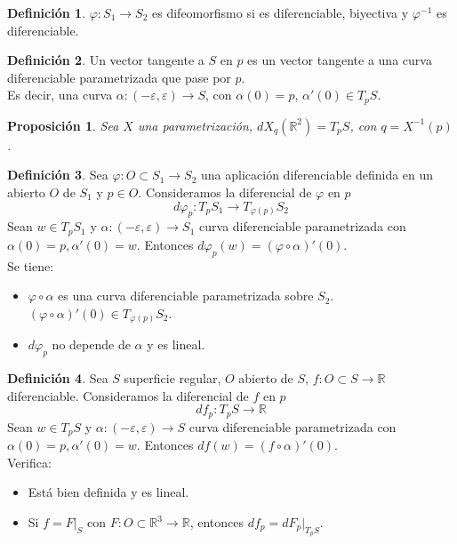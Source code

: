 \documentclass{report}
\newtheorem{proposition}[theorem]{Proposición}
\theoremstyle{remark}
\theoremstyle{remark}
\theoremstyle{definition}
\newtheorem{definition}{Definición}[chapter]
\theoremstyle{definition}
\theoremstyle{definition}
\begin{document}
\begin{definition}
    $\varphi : S_1 \to S_2$ es difeomorfismo si es diferenciable, biyectiva y $\varphi^{-1}$ es diferenciable.
\end{definition}

\begin{definition}
    Un vector tangente a $S$ en $p$ es un vector tangente a una curva diferenciable parametrizada que pase por $p$.\\
    Es decir, una curva $\alpha : (-\varepsilon, \varepsilon) \to S$, con $\alpha(0) = p$, $\alpha'(0) \in T_pS$.
\end{definition}

\begin{proposition}
    Sea $X$ una parametrización, $dX_q(\mathbb{R}^2) = T_pS$, con $q = X^{-1}(p)$.
\end{proposition}

\begin{definition}
    Sea $\varphi : O \subset S_1 \to S_2$ una aplicación diferenciable definida en un abierto $O$ de $S_1$ y $p \in O$.
    Consideramos la diferencial de $\varphi$ en $p$
    $$d\varphi_p : T_pS_1 \to T_{\varphi(p)}S_2$$
    Sean $w \in T_pS_1$ y $\alpha : (-\varepsilon, \varepsilon) \to S_1$ curva diferenciable parametrizada con $\alpha(0) = p, \alpha'(0) = w$.
    Entonces $d\varphi_p(w) = (\varphi \circ \alpha)'(0)$.\\
    Se tiene:
    \begin{itemize}
        \item $\varphi \circ \alpha$ es una curva diferenciable parametrizada sobre $S_2$. $(\varphi \circ \alpha)'(0) \in T_{\varphi(p)}S_2$.
        \item $d\varphi_p$ no depende de $\alpha$ y es lineal.
    \end{itemize}
\end{definition}

\begin{definition}
    Sea $S$ superficie regular, $O$ abierto de $S$, $f : O \subset S \to \mathbb{R}$ diferenciable.
    Consideramos la diferencial de $f$ en $p$
    $$df_p : T_pS \to \mathbb{R}$$
    Sean $w \in T_pS$ y $\alpha : (-\varepsilon, \varepsilon) \to S$ curva diferenciable parametrizada con $\alpha(0) = p, \alpha'(0) = w$.
    Entonces $df(w) = (f \circ \alpha)'(0)$.\\
    Verifica:
    \begin{itemize}
        \item Está bien definida y es lineal.
        \item Si $f = F|_S$ con $F : O \subset \mathbb{R}^3 \to \mathbb{R}$, entonces $df_p = dF_p|_{T_pS}$.
    \end{itemize}
\end{definition}
\end{document}

